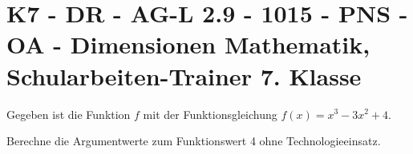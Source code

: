 \section{K7 - DR - AG-L 2.9 - 1015 - PNS - OA - Dimensionen Mathematik, Schularbeiten-Trainer 7. Klasse}

\begin{beispiel}[K7 - DR]{1} %
Gegeben ist die Funktion $f$ mit der Funktionsgleichung $f(x)=x^3-3x^2+4$.

Berechne die Argumentwerte zum Funktionswert 4 ohne Technologieeinsatz.\leer

				
				\end{beispiel}
